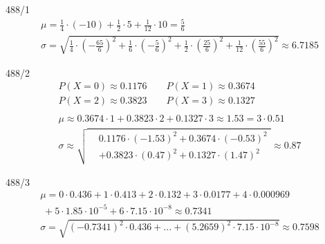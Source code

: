 \begin{exercise}{488/1}
  \begin{gather*}
    \mu = \frac{1}{4} \cdot (-10) + \frac{1}{2} \cdot 5 + \frac{1}{12} \cdot 10 = \frac{5}{6} \\
    \sigma = \sqrt{\frac{1}{4} \cdot (-\frac{65}{6})^2 + \frac{1}{6} \cdot (-\frac{5}{6})^2 + \frac{1}{2} \cdot (\frac{25}{6})^2 + \frac{1}{12} \cdot (\frac{55}{6})^2} \approx 6.7185
  \end{gather*}
\end{exercise}
\begin{exercise}{488/2}
  \begin{gather*}
    P(X = 0) \approx 0.1176 \qquad P(X = 1) \approx 0.3674 \\
    P(X = 2) \approx 0.3823 \qquad P(X = 3) \approx 0.1327 \\\\
    \mu \approx 0.3674 \cdot 1 + 0.3823 \cdot 2 + 0.1327 \cdot 3 \approx 1.53 = 3 \cdot 0.51 \\
    \sigma \approx \sqrt{
      \begin{aligned}
        &0.1176 \cdot (-1.53)^2 + 0.3674 \cdot (-0.53)^2 \\
        &+ 0.3823 \cdot (0.47)^2 + 0.1327 \cdot (1.47)^2
      \end{aligned}
    } \approx 0.87
  \end{gather*}
\end{exercise}
\begin{exercise}{488/3}
  \begin{gather*}
    \mu = 0 \cdot 0.436 + 1 \cdot 0.413 + 2 \cdot 0.132 + 3 \cdot 0.0177 + 4 \cdot 0.000969 \\
    \;+ 5 \cdot 1.85 \cdot 10^{-5} + 6 \cdot 7.15 \cdot 10^{-8} \approx 0.7341 \\
    \sigma = \sqrt{(-0.7341)^2 \cdot 0.436 + ... + (5.2659)^2 \cdot 7.15 \cdot 10^{-8}} \approx 0.7598
  \end{gather*}
\end{exercise}
